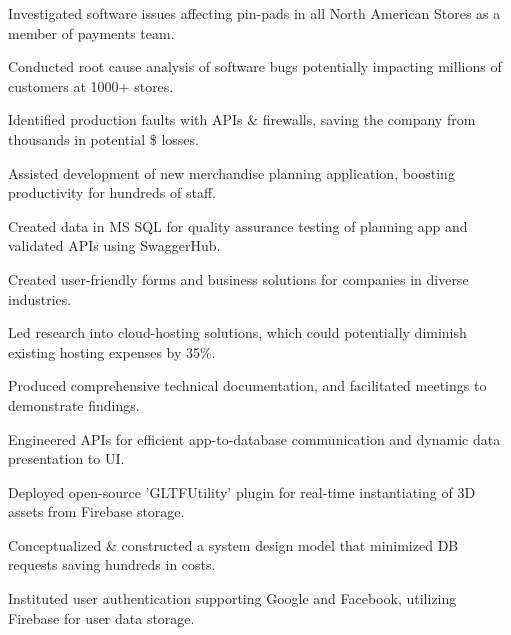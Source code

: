 \documentclass[]{deedy-resume-openfont}
\begin{document}
\hspace{1cm}
\begin{tightemize}
\item Investigated software issues affecting pin-pads in all North American Stores as a member of payments team.
\item Conducted root cause analysis of software bugs potentially impacting millions of customers at 1000+ stores.
\item Identified production faults with APIs \& firewalls, saving the company from thousands in potential \$ losses.
\item Assisted development of new merchandise planning application, boosting productivity for hundreds of staff.
\item Created data in MS SQL for quality assurance testing of planning app and validated APIs using SwaggerHub.
\end{tightemize}
\sectionsep

\hspace{1cm}
\begin{tightemize}
\item Created user-friendly forms and business solutions for companies in diverse industries.
\item Led research into cloud-hosting solutions, which could potentially diminish existing hosting expenses by 35\%.
\item Produced comprehensive technical documentation, and facilitated meetings to demonstrate findings.
\end{tightemize}




\hspace{1cm}
\begin{tightemize}
\item Engineered APIs for efficient app-to-database communication and dynamic data presentation to UI.
\item Deployed open-source 'GLTFUtility' plugin for real-time instantiating of 3D assets from Firebase storage.
\item Conceptualized \& constructed a system design model that minimized DB requests saving hundreds in costs.
\item Instituted user authentication supporting Google and Facebook, utilizing Firebase for user data storage.
\end{tightemize}
\sectionsep
\end{document}
